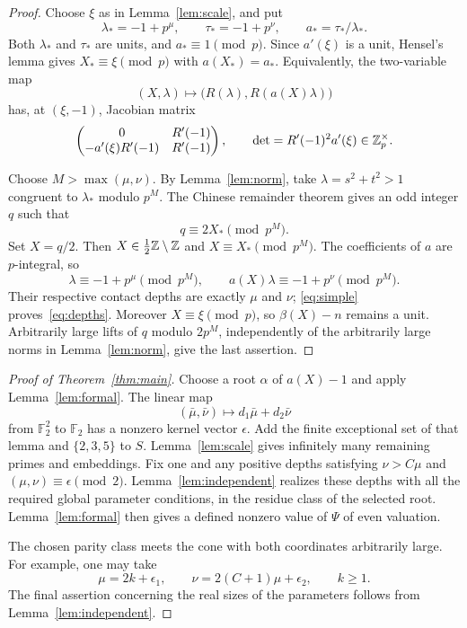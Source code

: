 \documentclass[11pt,a4paper]{article}
\theoremstyle{remark}\newtheorem{remark}[theorem]{Remark}
\newcommand{\F}{\mathbb F}
\begin{document}
\begin{proof}
Choose \(\xi\) as in Lemma~\ref{lem:scale}, and put
\[
 \lambda_*=-1+p^\mu,\qquad
 \tau_*=-1+p^\nu,\qquad
 a_*=\tau_*/\lambda_*.
\]
Both \(\lambda_*\) and \(\tau_*\) are units, and \(a_*\equiv1\pmod p\).
Since \(a'(\xi)\) is a unit, Hensel's lemma gives
\(X_*\equiv\xi\pmod p\) with \(a(X_*)=a_*\).
Equivalently, the two-variable map
\[
            (X,\lambda)\longmapsto
             \bigl(R(\lambda),R(a(X)\lambda)\bigr)
\]
has, at \((\xi,-1)\), Jacobian matrix
\[
 \begin{pmatrix}
 0 & R'(-1)\\
 -a'(\xi)R'(-1) & R'(-1)
 \end{pmatrix},
 \qquad
 \det=R'(-1)^2a'(\xi)\in\mathbb Z_p^\times .
\]

Choose \(M>\max(\mu,\nu)\).
By Lemma~\ref{lem:norm}, take
\(\lambda=s^2+t^2>1\) congruent to \(\lambda_*\) modulo \(p^M\).
The Chinese remainder theorem gives an odd integer \(q\) such that
\[
                       q\equiv2X_*\pmod{p^M}.
\]
Set \(X=q/2\). Then \(X\in\tfrac12\mathbb Z\setminus\mathbb Z\) and
\(X\equiv X_*\pmod{p^M}\).
The coefficients of \(a\) are \(p\)-integral, so
\[
       \lambda\equiv-1+p^\mu\pmod{p^M},\qquad
       a(X)\lambda\equiv-1+p^\nu\pmod{p^M}.
\]
Their respective contact depths are exactly \(\mu\) and \(\nu\);
\eqref{eq:simple} proves~\eqref{eq:depths}.
Moreover \(X\equiv\xi\pmod p\), so \(\beta(X)-n\) remains a unit.
Arbitrarily large lifts of \(q\) modulo \(2p^M\), independently
of the arbitrarily large norms in Lemma~\ref{lem:norm}, give
the last assertion.
\end{proof}

\begin{proof}[Proof of Theorem~\ref{thm:main}]
Choose a root \(\alpha\) of \(a(X)-1\) and apply
Lemma~\ref{lem:formal}. The linear map
\[
              (\bar\mu,\bar\nu)\longmapsto
                         d_1\bar\mu+d_2\bar\nu
\]
from \(\F_2^2\) to \(\F_2\) has a nonzero kernel vector
\(\epsilon\). Add the finite exceptional set of that lemma
and \(\{2,3,5\}\) to \(S\).
Lemma~\ref{lem:scale} gives infinitely many remaining primes
and embeddings. Fix one and any positive depths satisfying
\(\nu>C\mu\) and \((\mu,\nu)\equiv\epsilon\pmod2\).
Lemma~\ref{lem:independent} realizes these depths with all the
required global parameter conditions, in the residue class
of the selected root. Lemma~\ref{lem:formal} then gives a
defined nonzero value of \(\Psi\) of even valuation.

The chosen parity class meets the cone with both coordinates
arbitrarily large. For example, one may take
\[
       \mu=2k+\epsilon_1,\qquad
       \nu=2(C+1)\mu+\epsilon_2,\qquad k\ge1 .
\]
The final assertion concerning the real sizes of the parameters
follows from Lemma~\ref{lem:independent}.
\end{proof}
\end{document}
